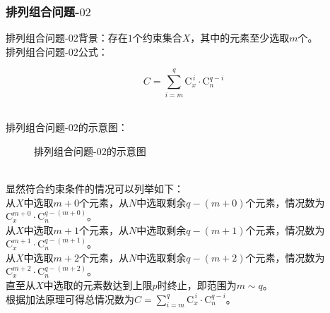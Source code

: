\documentclass[UTF8]{ctexart}
\newcommand{\rnum}[1]{\uppercase\expandafter{\romannumeral #1\relax}}
\newcommand{\Co}{\mathrm{C}}
\begin{document}
\subsubsection{排列组合问题\rnum{2}-$02$}
    排列组合问题\rnum{2}-$02$背景：存在$1$个约束集合$X$，其中的元素至少选取$m$个。\\[3mm]
    排列组合问题\rnum{2}-$02$公式：
    \begin{large}
        \begin{equation*}
            C=\sum_{i=m}^{q}\Co_{x}^{\,i}\cdot\Co_{n}^{q-i}
        \end{equation*}
    \end{large}\\
    排列组合问题\rnum{2}-$02$的示意图：\vspace{5pt}
    \begin{figure}[h]
        \begin{center}
            \caption{排列组合问题\rnum{2}-$02$的示意图}
        \end{center}
    \end{figure}\\
    显然符合约束条件的情况可以列举如下：\\[3mm]
    从$X$中选取$m+0$个元素，从$N$中选取剩余$q-(m+0)$个元素，情况数为$\Co_{x}^{m+0}\cdot\Co_{n}^{q-(m+0)}$。\\[3mm]
    从$X$中选取$m+1$个元素，从$N$中选取剩余$q-(m+1)$个元素，情况数为$\Co_{x}^{m+1}\cdot\Co_{n}^{q-(m+1)}$。\\[3mm]
    从$X$中选取$m+2$个元素，从$N$中选取剩余$q-(m+2)$个元素，情况数为$\Co_{x}^{m+2}\cdot\Co_{n}^{q-(m+2)}$。\\[3mm]
    直至从$X$中选取的元素数达到上限$p$时终止，即范围为$m\sim q$。\\[3mm]
    根据加法原理可得总情况数为$C=\sum_{i=m}^{q}\Co_{x}^{\,i}\cdot\Co_{n}^{q-i}$。
\end{document}
